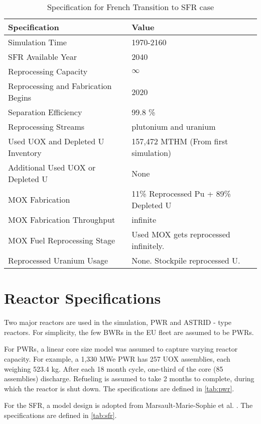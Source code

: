\begin{table}[h]
	\centering
	\begin{tabularx}{\textwidth}{bb}
		\hline
		Specification & Value \\
		\hline
		Simulation Time & 1970-2160 \\
		\gls{SFR} Available Year & 2040 \\
		Reprocessing Capacity & $\infty$ \\
		Reprocessing and Fabrication Begins & 2020 \\
		Separation Efficiency & 99.8 \% \\
		Reprocessing Streams & plutonium and uranium \\
		\small{Used \gls{UOX} and Depleted U Inventory} & 157,472 MTHM {\small (From first simulation)} \\
		\small{Additional Used \gls{UOX} or Depleted U} & None  \\
		\gls{MOX} Fabrication &  \small{11\% Reprocessed Pu + 89\% Depleted U}  \\
		\gls{MOX} Fabrication Throughput & infinite \\
		\gls{MOX} Fuel Reprocessing Stage &  Used \gls{MOX} gets reprocessed infinitely. \\
		Reprocessed Uranium Usage &  None. Stockpile reprocessed U. \\
		\hline
	\end{tabularx}
	\caption {Specification for French Transition to \gls{SFR} case }
	\label{tab:sim_france}
\end{table}


\section{Reactor Specifications}
Two major reactors are used in the simulation, \gls{PWR} and ASTRID - type reactors.
For simplicity, the few \glspl{BWR} in the \gls{EU} fleet are assumed to be \glspl{PWR}.

For \glspl{PWR}, a linear core size model was assumed to capture
varying reactor capacity. For example, a 
1,330 MWe PWR has 257 \gls{UOX} assemblies, each
weighing 523.4 kg.
After each 18 month cycle, one-third of the 
core (85 assemblies) discharge. Refueling
is assumed to take 2 months to complete, during which the reactor
is shut down. The specifications are defined in \cref{tab:pwr}.

For the \gls{SFR}, a model design is adopted from
Marsault-Marie-Sophie et al. \cite{marsaultmarie-sophie_pre-conceptual_2012}.
The specifications are defined in \cref{tab:sfr}.

